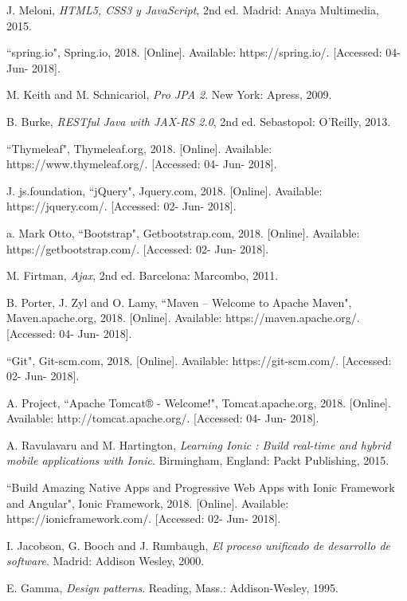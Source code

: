 
\begin{thebibliography}{9}


\thispagestyle{numberingStyle}
\pagestyle{numberingStyle}


J. Meloni, \textit{HTML5, CSS3 y JavaScript}, 2nd ed. Madrid: Anaya Multimedia, 2015.

``spring.io", Spring.io, 2018. [Online]. Available: https://spring.io/. [Accessed: 04- Jun- 2018].

M. Keith and M. Schnicariol, \textit{Pro JPA 2}. New York: Apress, 2009.

B. Burke, \textit{RESTful Java with JAX-RS 2.0}, 2nd ed. Sebastopol: O'Reilly, 2013.

``Thymeleaf", Thymeleaf.org, 2018. [Online]. Available: https://www.thymeleaf.org/. [Accessed: 04- Jun- 2018].

J. js.foundation, ``jQuery", Jquery.com, 2018. [Online]. Available: https://jquery.com/. [Accessed: 02- Jun- 2018].

a. Mark Otto, ``Bootstrap", Getbootstrap.com, 2018. [Online]. Available: https://getbootstrap.com/. [Accessed: 02- Jun- 2018].


M. Firtman, \textit{Ajax}, 2nd ed. Barcelona: Marcombo, 2011.

B. Porter, J. Zyl and O. Lamy, ``Maven – Welcome to Apache Maven", Maven.apache.org, 2018. [Online]. Available: https://maven.apache.org/. [Accessed: 04- Jun- 2018].


``Git", Git-scm.com, 2018. [Online]. Available: https://git-scm.com/. [Accessed: 02- Jun- 2018].

A. Project, ``Apache Tomcat® - Welcome!", Tomcat.apache.org, 2018. [Online]. Available: http://tomcat.apache.org/. [Accessed: 04- Jun- 2018].

A. Ravulavaru and M. Hartington, \textit{Learning Ionic : Build real-time and hybrid mobile applications with Ionic}. Birmingham, England: Packt Publishing, 2015.

``Build Amazing Native Apps and Progressive Web Apps with Ionic Framework and Angular", Ionic Framework, 2018. [Online]. Available: https://ionicframework.com/. [Accessed: 02- Jun- 2018].

I. Jacobson, G. Booch and J. Rumbaugh, \textit{El proceso unificado de desarrollo de software}. Madrid: Addison Wesley, 2000.

E. Gamma, \textit{Design patterns}. Reading, Mass.: Addison-Wesley, 1995.



\end{thebibliography}

